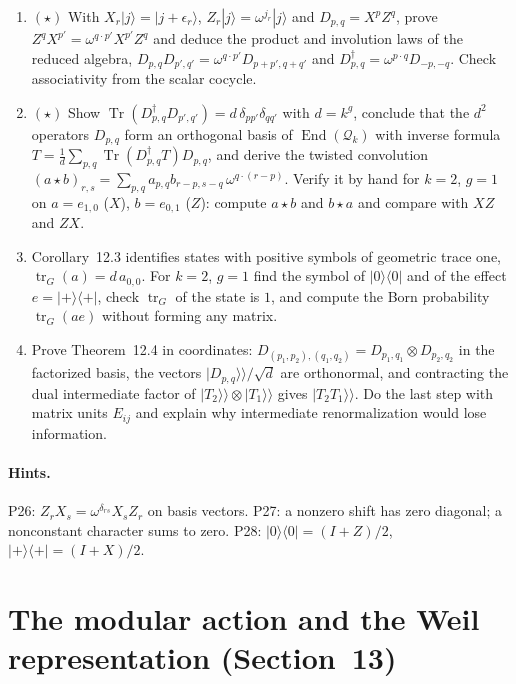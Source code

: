 \documentclass[11pt]{article}
\newcommand{\Tr}{\operatorname{Tr}}
\begin{document}
\begin{enumerate}[label=\textbf{P\arabic*.},leftmargin=*,start=26]
\item $(\star)$ With $X_r|j\rangle = |j+\epsilon_r\rangle$, $Z_r|j\rangle = \omega^{j_r}|j\rangle$
  and $D_{p,q} = X^pZ^q$, prove $Z^qX^{p'} = \omega^{q\cdot p'}X^{p'}Z^q$ and deduce
  the product and involution laws of the reduced algebra,
  $D_{p,q}D_{p',q'} = \omega^{q\cdot p'}D_{p+p',q+q'}$ and
  $D_{p,q}^\dagger = \omega^{p\cdot q}D_{-p,-q}$. Check associativity from the
  scalar cocycle.
\item $(\star)$ Show $\Tr(D_{p,q}^\dagger D_{p',q'}) = d\,\delta_{pp'}\delta_{qq'}$ with $d = k^g$,
  conclude that the $d^2$ operators $D_{p,q}$ form an orthogonal basis of
  $\operatorname{End}(\mathcal Q_k)$ with inverse formula
  $T = \frac1d\sum_{p,q}\Tr(D_{p,q}^\dagger T)D_{p,q}$, and derive the twisted
  convolution $(a\star b)_{r,s} = \sum_{p,q}a_{p,q}b_{r-p,s-q}\,\omega^{q\cdot(r-p)}$.
  Verify it by hand for $k = 2$, $g = 1$ on $a = e_{1,0}$ ($X$), $b = e_{0,1}$ ($Z$):
  compute $a\star b$ and $b\star a$ and compare with $XZ$ and $ZX$.
\item Corollary~12.3 identifies states with positive symbols of geometric trace
  one, $\operatorname{tr}_G(a) = d\,a_{0,0}$. For $k = 2$, $g = 1$ find the
  symbol of $|0\rangle\langle0|$ and of the effect $e = |+\rangle\langle+|$,
  check $\operatorname{tr}_G$ of the state is $1$, and compute the Born
  probability $\operatorname{tr}_G(ae)$ without forming any matrix.
\item Prove Theorem~12.4 in coordinates: $D_{(p_1,p_2),(q_1,q_2)} = D_{p_1,q_1}\otimes D_{p_2,q_2}$
  in the factorized basis, the vectors $|D_{p,q}\rangle\!\rangle/\sqrt d$ are
  orthonormal, and contracting the dual intermediate factor of
  $|T_2\rangle\!\rangle\otimes|T_1\rangle\!\rangle$ gives $|T_2T_1\rangle\!\rangle$.
  Do the last step with matrix units $E_{ij}$ and explain why intermediate
  renormalization would lose information.
\end{enumerate}

\paragraph{Hints.} P26: $Z_rX_s = \omega^{\delta_{rs}}X_sZ_r$ on basis vectors. P27: a nonzero shift has zero diagonal; a nonconstant character sums to zero. P28: $|0\rangle\langle0| = (I+Z)/2$, $|+\rangle\langle+| = (I+X)/2$.

\section{The modular action and the Weil representation (Section~13)}
\end{document}
